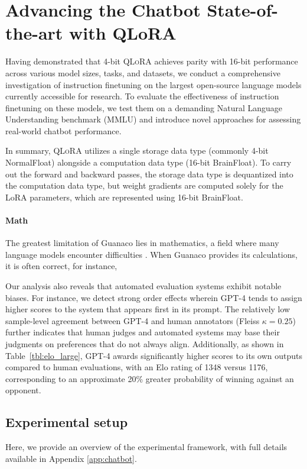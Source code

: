 \section{Advancing the Chatbot State-of-the-art with QLoRA}
\label{sec:pushing}
Having demonstrated that 4-bit \textsc{QLoRA} achieves parity with 16-bit performance across various model sizes, tasks, and datasets, we conduct a comprehensive investigation of instruction finetuning on the largest open-source language models currently accessible for research. To evaluate the effectiveness of instruction finetuning on these models, we test them on a demanding Natural Language Understanding benchmark (MMLU) and introduce novel approaches for assessing real-world chatbot performance.

In summary, \textsc{QLoRA} utilizes a single storage data type (commonly 4-bit NormalFloat) alongside a computation data type (16-bit BrainFloat). To carry out the forward and backward passes, the storage data type is dequantized into the computation data type, but weight gradients are computed solely for the LoRA parameters, which are represented using 16-bit BrainFloat.

\paragraph{Math} The greatest limitation of {Guanaco} lies in mathematics, a field where many language models encounter difficulties \citep{liang2022holistic}. When {Guanaco} provides its calculations, it is often correct, for instance,

Our analysis also reveals that automated evaluation systems exhibit notable biases. For instance, we detect strong order effects wherein GPT-4 tends to assign higher scores to the system that appears first in its prompt. The relatively low sample-level agreement between GPT-4 and human annotators (Fleiss $\kappa=0.25$) further indicates that human judges and automated systems may base their judgments on preferences that do not always align. Additionally, as shown in Table~\ref{tbl:elo_large}, GPT-4 awards significantly higher scores to its own outputs compared to human evaluations, with an Elo rating of 1348 versus 1176, corresponding to an approximate 20\% greater probability of winning against an opponent.

\subsection{Experimental setup} Here, we provide an overview of the experimental framework, with full details available in Appendix \ref{app:chatbot}.

